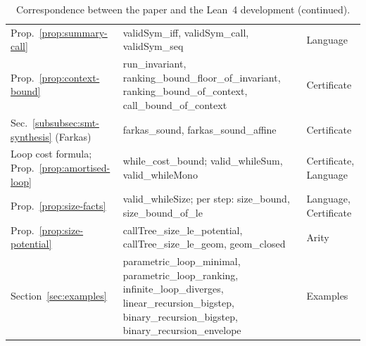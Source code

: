 \documentclass[oneside,english]{amsart}
\numberwithin{equation}{section}
\numberwithin{figure}{section}
\theoremstyle{plain}
\theoremstyle{definition}
\theoremstyle{plain}
\theoremstyle{remark}
\theoremstyle{plain}
\theoremstyle{definition}
\theoremstyle{plain}
\theoremstyle{remark}
\newcommand{\lean}[1]{{\ttfamily\small #1}}
\begin{document}
\begin{table}[p]
\begin{tabular}{@{}>{\raggedright\arraybackslash}p{}>{\raggedright\arraybackslash}p{}>{\raggedright\arraybackslash}p{}@{}}
Prop.~\ref{prop:summary-call} & \lean{validSym\_\allowbreak iff}, \lean{validSym\_\allowbreak call}, \lean{validSym\_\allowbreak seq} & \lean{Language} \\
Prop.~\ref{prop:context-bound} & \lean{run\_\allowbreak invariant}, \lean{ranking\_\allowbreak bound\_\allowbreak floor\_\allowbreak of\_\allowbreak invariant}, \lean{ranking\_\allowbreak bound\_\allowbreak of\_\allowbreak context}, \lean{call\_\allowbreak bound\_\allowbreak of\_\allowbreak context} & \lean{Certificate} \\
Sec.~\ref{subsubsec:smt-synthesis} (Farkas) & \lean{farkas\_\allowbreak sound}, \lean{farkas\_\allowbreak sound\_\allowbreak affine} & \lean{Certificate} \\
Loop cost formula; Prop.~\ref{prop:amortised-loop} & \lean{while\_\allowbreak cost\_\allowbreak bound}; \lean{valid\_\allowbreak whileSum}, \lean{valid\_\allowbreak whileMono} & \lean{Certificate}, \lean{Language} \\
Prop.~\ref{prop:size-facts} & \lean{valid\_\allowbreak whileSize}; per step: \lean{size\_\allowbreak bound}, \lean{size\_\allowbreak bound\_\allowbreak of\_\allowbreak le} & \lean{Language}, \lean{Certificate} \\
Prop.~\ref{prop:size-potential} & \lean{callTree\_\allowbreak size\_\allowbreak le\_\allowbreak potential}, \lean{callTree\_\allowbreak size\_\allowbreak le\_\allowbreak geom}, \lean{geom\_\allowbreak closed} & \lean{Arity} \\
Section~\ref{sec:examples} & \lean{parametric\_\allowbreak loop\_\allowbreak minimal}, \lean{parametric\_\allowbreak loop\_\allowbreak ranking}, \lean{infinite\_\allowbreak loop\_\allowbreak diverges}, \lean{linear\_\allowbreak recursion\_\allowbreak bigstep}, \lean{binary\_\allowbreak recursion\_\allowbreak bigstep}, \lean{binary\_\allowbreak recursion\_\allowbreak envelope} & \lean{Examples} \\
\bottomrule
\end{tabular}
\addtocounter{table}{-1}\renewcommand{\theHtable}{\arabic{table}.cont}%
\caption{Correspondence between the paper and the Lean~4 development (continued).}
\end{table}
\end{document}
